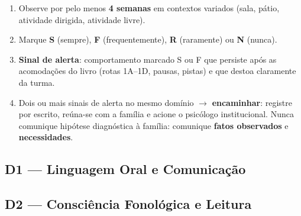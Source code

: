 \begin{enumerate}[leftmargin=2cm]
  \item Observe por pelo menos \textbf{4 semanas} em contextos variados
        (sala, pátio, atividade dirigida, atividade livre).
  \item Marque \textbf{S} (sempre), \textbf{F} (frequentemente),
        \textbf{R} (raramente) ou \textbf{N} (nunca).
  \item \textbf{Sinal de alerta}: comportamento marcado S ou F que persiste
        após as acomodações do livro (rotas 1A--1D, pausas, pistas) e que
        destoa claramente da turma.
  \item Dois ou mais sinais de alerta no mesmo domínio $\rightarrow$
        \textbf{encaminhar}: registre por escrito, reúna-se com a família e
        acione o psicólogo institucional. Nunca comunique hipótese diagnóstica
        à família: comunique \textbf{fatos observados} e \textbf{necessidades}.
\end{enumerate}

\subsection{D1 --- Linguagem Oral e Comunicação}

\begin{center}
\end{center}


\subsection{D2 --- Consciência Fonológica e Leitura}

